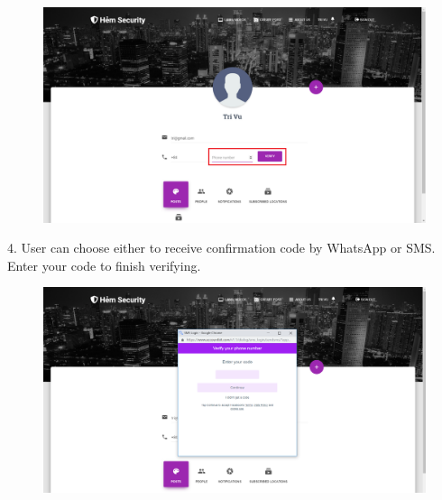 \begin{center}
	\begin{figure}[H]
		\centering
		\includegraphics[width=1\columnwidth]{images/chap6/instruction3.png}
	\end{figure}
\end{center}
4. User can choose either to receive confirmation code by WhatsApp or SMS. Enter your code to finish verifying.
\begin{center}
	\begin{figure}[H]
		\centering
		\includegraphics[width=1\columnwidth]{images/chap6/instruction4.png}
	\end{figure}
\end{center}

